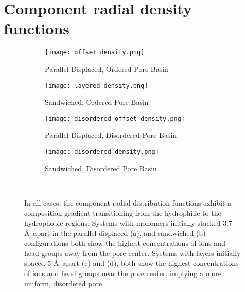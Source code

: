   \section{Component radial density functions}\label{S-section:radial_density}
  \begin{figure}[!htb]
  \centering
  \begin{subfigure}{0.47\textwidth}
        \texttt{[image: offset\_density.png]}
        \caption{Parallel Displaced, Ordered Pore Basin}
        \label{S-fig:offset_density}
  \end{subfigure}
  \begin{subfigure}{0.47\textwidth}
        \texttt{[image: layered\_density.png]}
        \caption{Sandwiched, Ordered Pore Basin}
        \label{S-fig:layered_density}
  \end{subfigure}
  \begin{subfigure}{0.47\textwidth}
        \texttt{[image: disordered\_offset\_density.png]}
        \caption{Parallel Displaced, Disordered Pore Basin}
        \label{S-fig:disordered_offset_density}
  \end{subfigure}
  \begin{subfigure}{0.47\textwidth}
        \texttt{[image: disordered\_density.png]}
        \caption{Sandwiched, Disordered Pore Basin}
        \label{S-fig:disorder_layered_density}
  \end{subfigure}
  \caption{In all cases, the component radial distribution functions exhibit a
	  composition gradient transitioning from the hydrophilic to the hydrophobic
	  regions. Systems with monomers initially stacked 3.7 \AA~apart in the parallel
	  displaced (a), and sandwiched (b) configurations both show the highest
	  concentrations of ions and head groups away from the pore center. Systems with
	  layers initially spaced 5 \AA~apart (c) and (d), both show the highest
	  concentrations of ions and head groups near the pore center, implying a more
	  uniform, disordered pore.}~\label{S-fig:densities}
  \end{figure}
  \clearpage

